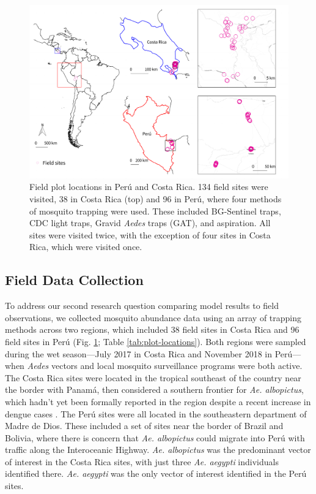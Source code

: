 \begin{figure}[!ht]
\includegraphics[width=\textwidth]{figures/ch3-map-field.pdf}
\centering
\caption[Field plot locations in Perú and Costa Rica.]{Field plot locations in Perú and Costa Rica. 134 field sites were visited, 38 in Costa Rica (top) and 96 in Perú, where four methods of mosquito trapping were used. These included BG-Sentinel traps, CDC light traps, Gravid \textit{Aedes} traps (GAT), and aspiration. All sites were visited twice, with the exception of four sites in Costa Rica, which were visited once.}
\label{fig:map-field}
\end{figure}

\subsection{Field Data Collection}

To address our second research question comparing model results to field observations, we collected mosquito abundance data using an array of trapping methods across two regions, which included 38 field sites in Costa Rica and 96 field sites in Perú (Fig. \ref{fig:map-field}; Table \ref{tab:plot-locations}). Both regions were sampled during the wet season—July 2017 in Costa Rica and November 2018 in Perú—when \textit{Aedes} vectors and local mosquito surveillance programs were both active. The Costa Rica sites were located in the tropical southeast of the country near the border with Panamá, then considered a southern frontier for \textit{Ae. albopictus}, which hadn’t yet been formally reported in the region despite a recent increase in dengue cases \cite{Gutierrez2015-hx}. The Perú sites were all located in the southeastern department of Madre de Dios. These included a set of sites near the border of Brazil and Bolivia, where there is concern that \textit{Ae. albopictus} could migrate into Perú with traffic along the Interoceanic Highway. \textit{Ae. albopictus} was the predominant vector of interest in the Costa Rica sites, with just three \textit{Ae. aegypti} individuals identified there. \textit{Ae. aegypti} was the only vector of interest identified in the Perú sites.

